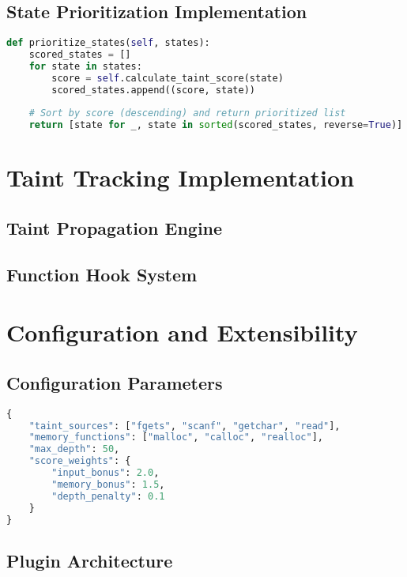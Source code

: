\subsection{State Prioritization Implementation}
\begin{lstlisting}[language=Python]
def prioritize_states(self, states):
    scored_states = []
    for state in states:
        score = self.calculate_taint_score(state)
        scored_states.append((score, state))
    
    # Sort by score (descending) and return prioritized list
    return [state for _, state in sorted(scored_states, reverse=True)]
\end{lstlisting}

\section{Taint Tracking Implementation}
\subsection{Taint Propagation Engine}

\subsection{Function Hook System}

\section{Configuration and Extensibility}
\subsection{Configuration Parameters}
\begin{lstlisting}[language=Python]
{
    "taint_sources": ["fgets", "scanf", "getchar", "read"],
    "memory_functions": ["malloc", "calloc", "realloc"],
    "max_depth": 50,
    "score_weights": {
        "input_bonus": 2.0,
        "memory_bonus": 1.5,
        "depth_penalty": 0.1
    }
}
\end{lstlisting}

\subsection{Plugin Architecture}
